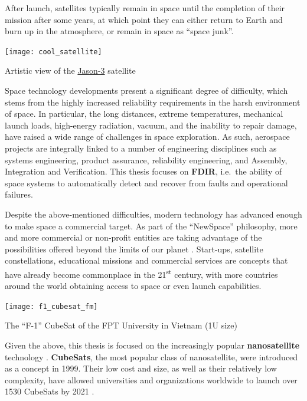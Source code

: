 \documentclass[a4paper,nobib,final]{tufte-book}
\def\acusepage#1{}
\begin{document}
After launch, satellites typically remain in space until the completion of their mission after some years, at which point they can either return to Earth and burn up in the atmosphere, or remain in space as ``space junk''.

\begin{marginfigure}
	\texttt{[image: cool\_satellite]}
	\caption[Artistic view of the Jason-3 satellite]{Artistic view of the \href{https://www.flickr.com/photos/noaasatellites/16979948568}{Jason-3} satellite} %
\end{marginfigure}

Space technology developments present a significant degree of difficulty, which stems from the highly increased reliability requirements in the harsh environment of space. In particular, the long distances, extreme temperatures, mechanical launch loads, high-energy radiation, vacuum, and the inability to repair damage, have raised a wide range of challenges in space exploration. As such, aerospace projects are integrally linked to a number of engineering disciplines such as systems engineering, product assurance, reliability engineering, and Assembly, Integration and Verification. This thesis focuses on \textbf{\acf{FDIR}}, i.e.\ the ability of space systems to automatically detect and recover from faults and operational failures.%
	
Despite the above-mentioned difficulties, modern technology has advanced enough to make space a commercial target. As part of the ``NewSpace'' philosophy, more and more commercial or non-profit entities are taking advantage of the possibilities offered beyond the limits of our planet \autocite{denis_new_space_2020}. Start-ups, satellite constellations, educational missions and commercial services are concepts that have already become commonplace in the 21\textsuperscript{st} century, with more countries around the world obtaining access to space or even launch capabilities.
	
\begin{marginfigure}
	\texttt{[image: f1\_cubesat\_fm]}
	\caption{The ``F-1'' CubeSat of the FPT University in Vietnam (1U size)}
	\label{fig:cubesat}
\end{marginfigure}

Given the above, this thesis is focused on the increasingly popular \textbf{nanosatellite} technology \autocite{sweeting_modern_small_2018a}. \textbf{CubeSats}, the most popular class of nanosatellite, were introduced as a concept in 1999. Their low cost and size, as well as their relatively low complexity, have allowed universities and organizations worldwide to launch over 1530 CubeSats by 2021 \autocite{swartwout_cubesat_database_2021}.
	
\end{document}
